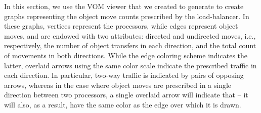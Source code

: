 In this section, we use the VOM viewer that we created to generate
to create graphs representing the object move counts prescribed by
the load-balancer.
In these graphs, vertices represent the processors, while edges
represent object moves, and are endowed with two attributes: directed
and undirected moves, i.e., respectively, the number of object
transfers in each direction, and the total count of movements in both
directions.
While the edge coloring scheme indicates the latter, overlaid arrows
using the same color scale indicate the prescribed traffic in each
direction.
In particular, two-way traffic is indicated by pairs of opposing
arrows, whereas in the case where object moves are prescribed in a
single direction between two processors, a single overlaid arrow will
indicate that -- it will also, as a result, have the same color as the
edge over which it is drawn.
